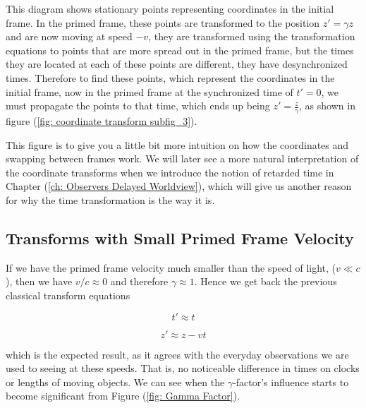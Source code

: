 This diagram shows stationary points representing coordinates in the initial frame.
In the primed frame, these points are transformed to the position ${z{'}} = {\gamma} {z}$ and are now moving at speed $-{v}$, they are transformed using the transformation equations to points that are more spread out in the primed frame, but the times they are located at each of these points are different, they have desynchronized times.
Therefore to find these points, which represent the coordinates in the initial frame, now in the primed frame at the synchronized time of ${t{'}} = 0$, we must propagate the points to that time, which ends up being ${z{'}} = \frac{{z}}{{\gamma}}$, as shown in figure (\ref{fig: coordinate transform subfig_3}).

This figure is to give you a little bit more intuition on how the coordinates and swapping between frames work.
We will later see a more natural interpretation of the coordinate transforms when we introduce the notion of retarded time in Chapter (\ref{ch: Observers Delayed Worldview}), which will give us another reason for why the time transformation is the way it is.

\subsection{Transforms with Small Primed Frame Velocity} \label{subsect: Transforms with Slow Primed Frame Velocity}

If we have the primed frame velocity much smaller than the speed of light, ($v \ll c$), then we have ${v}/{c}\approx 0$ and therefore $\gamma \approx 1$.
Hence we get back the previous classical transform equations

\begin{equation}
	{t{'}} \approx t
\end{equation}

\begin{equation}
	z{'} \approx {z}-{v}{t}
\end{equation}

which is the expected result, as it agrees with the everyday observations we are used to seeing at these speeds.
That is, no noticeable difference in times on clocks or lengths of moving objects.
We can see when the $\gamma$-factor's influence starts to become significant from Figure (\ref{fig: Gamma Factor}).

